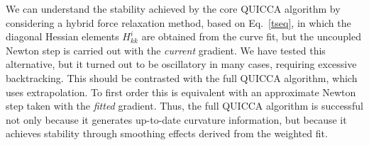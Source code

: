 \documentclass[prl,aps,preprint,showpacs,superbib]{revtex4}
\begin{document}
We can understand the stability achieved by the core QUICCA
algorithm by considering a hybrid force relaxation method, based on Eq.~\ref{tseq},
in which the diagonal Hessian elements $H^i_{kk}$ are obtained from the 
curve fit, but the uncoupled Newton step is carried out with the {\em current} 
gradient.  We have tested this alternative, but it turned out to be oscillatory 
in many cases, requiring excessive backtracking.  This should be contrasted with the
full QUICCA algorithm, which uses extrapolation. To first order this is equivalent with 
an approximate Newton step taken with the {\em fitted} gradient.   Thus, the full 
QUICCA algorithm is successful not only because it generates up-to-date curvature information, 
but because it achieves stability through smoothing effects derived from the weighted fit.

\end{document}
